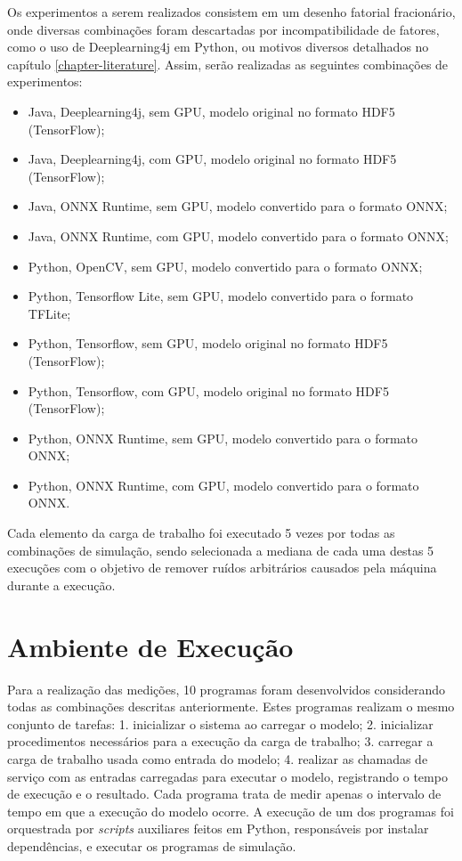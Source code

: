 Os experimentos a serem realizados consistem em um desenho fatorial fracionário, onde diversas combinações foram descartadas por incompatibilidade de fatores, como o uso de Deeplearning4j em Python, ou motivos diversos detalhados no capítulo \ref{chapter-literature}. Assim, serão realizadas as seguintes combinações de experimentos:

\begin{itemize}
  \item Java, Deeplearning4j, sem GPU, modelo original no formato HDF5 (TensorFlow);
  \item Java, Deeplearning4j, com GPU, modelo original no formato HDF5 (TensorFlow);
  \item Java, ONNX Runtime, sem GPU, modelo convertido para o formato ONNX;
  \item Java, ONNX Runtime, com GPU, modelo convertido para o formato ONNX;
  \item Python, OpenCV, sem GPU, modelo convertido para o formato ONNX;
  \item Python, Tensorflow Lite, sem GPU, modelo convertido para o formato TFLite;
  \item Python, Tensorflow, sem GPU, modelo original no formato HDF5 (TensorFlow);
  \item Python, Tensorflow, com GPU, modelo original no formato HDF5 (TensorFlow);
  \item Python, ONNX Runtime, sem GPU, modelo convertido para o formato ONNX;
  \item Python, ONNX Runtime, com GPU, modelo convertido para o formato ONNX.
\end{itemize}

Cada elemento da carga de trabalho foi executado 5 vezes por todas as combinações de simulação, sendo selecionada a mediana de cada uma destas 5 execuções com o objetivo de remover ruídos arbitrários causados pela máquina durante a execução.

\section{Ambiente de Execução}

Para a realização das medições, 10 programas foram desenvolvidos considerando todas as combinações descritas anteriormente. Estes programas realizam o mesmo conjunto de tarefas: 1. inicializar o sistema ao carregar o modelo; 2. inicializar procedimentos necessários para a execução da carga de trabalho; 3. carregar a carga de trabalho usada como entrada do modelo; 4. realizar as chamadas de serviço com as entradas carregadas para executar o modelo, registrando o tempo de execução e o resultado. Cada programa trata de medir apenas o intervalo de tempo em que a execução do modelo ocorre. A execução de um dos programas foi orquestrada por \textit{scripts} auxiliares feitos em Python, responsáveis por instalar dependências, e executar os programas de simulação.

